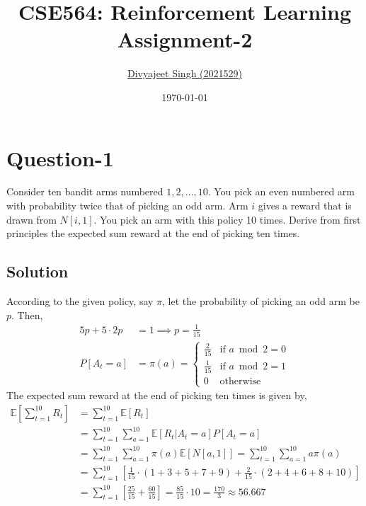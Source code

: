 \documentclass[11pt]{article}
\title{
    \textbf{CSE564: Reinforcement Learning} \\ \vspace*{-5pt}
    \textbf{\large{Assignment-2}}
}
\author{\href{mailto:divyajeet21529@iiitd.ac.in}{Divyajeet Singh (2021529)}}
\date{\today}
\begin{document}
    \maketitle

    \section*{Question-1}
    Consider ten bandit arms numbered $1, 2, \hdots, 10$. You pick an even numbered arm with
    probability twice that of picking an odd arm. Arm $i$ gives a reward that is drawn from $N[i, 1]$.
    You pick an arm with this policy 10 times. Derive from first principles the expected sum reward
    at the end of picking ten times.

    \subsection*{Solution}
    According to the given policy, say $\pi$, let the probability of picking an odd arm be $p$. Then,
    \begin{align*}
        5p + 5 \cdot 2p &= 1 \implies p = \frac{1}{15} \\
        P[A_{t} = a] &= \pi(a) = \begin{cases}
            \frac{2}{15} & \text{if } a \bmod 2 = 0 \\
            \frac{1}{15} & \text{if } a \bmod 2 = 1 \\
            0 & \text{otherwise}
        \end{cases}
    \end{align*}
    The expected sum reward at the end of picking ten times is given by,
    \begin{align*}
        \mathbb{E} \left[ \sum_{t=1}^{10} R_{t} \right] &= \sum_{t=1}^{10} \mathbb{E}[R_{t}] \\
        &= \sum_{t=1}^{10} \sum_{a=1}^{10} \mathbb{E}[R_{t} | A_{t} = a] P[A_{t} = a] \\
        &= \sum_{t=1}^{10} \sum_{a=1}^{10} \pi(a) \mathbb{E}[N[a, 1]]
         = \sum_{t=1}^{10} \sum_{a=1}^{10} a\pi(a) \\
        &= \sum_{t=1}^{10} \left[ \frac{1}{15} \cdot (1 + 3 + 5 + 7 + 9) + \frac{2}{15} \cdot (2 + 4 + 6 + 8 + 10) \right] \\
        &= \sum_{t=1}^{10} \left[ \frac{25}{15} + \frac{60}{15} \right] = \frac{85}{15} \cdot 10
         = \frac{170}{3} \approx 56.667
    \end{align*}
\end{document}
